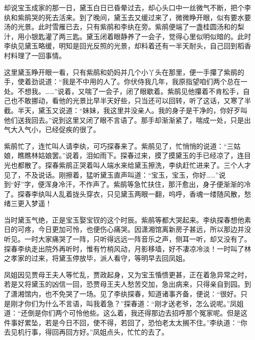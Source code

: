 \begin{parag}
    却说宝玉成家的那一日，黛玉白日已昏晕过去，却心头口中一丝微气不断，把个李纨和紫鹃哭的死去活来。到了晚间，黛玉去又缓过来了，微微睁开眼，似有要水要汤的光景。此时雪雁已去，只有紫鹃和李纨在旁。紫鹃便端了一盏桂圆汤和的梨汁，用小银匙灌了两三匙。黛玉闭着眼静养了一会子，觉得心里似明似暗的。此时李纨见黛玉略缓，明知是回光反照的光景，却料着还有一半天耐头，自己回到稻香村料理了一回事情。
\end{parag}


\begin{parag}
    这里黛玉睁开眼一看，只有紫鹃和奶妈并几个小丫头在那里，便一手攥了紫鹃的手，使着劲说道：“我是不中用的人了。你伏侍我几年，我原指望咱们两个总在一处。不想我。……”说着，又喘了一会子，闭了眼歇着。紫鹃见他攥着不肯松手，自己也不敢挪动，看他的光景比早半天好些，只当还可以回转，听了这话，又寒了半截。半天，黛玉又说道：“妹妹，我这里并没亲人。我的身子是干净的，你好歹叫他们送我回去。”说到这里又闭了眼不言语了。那手却渐渐紧了，喘成一处，只是出气大入气小，已经促疾的很了。
\end{parag}


\begin{parag}
    紫鹃忙了，连忙叫人请李纨，可巧探春来了。紫鹃见了，忙悄悄的说道：“三姑娘，瞧瞧林姑娘罢。”说着，泪如雨下。探春过来，摸了摸黛玉的手已经凉了，连目光也都散了。探春紫鹃正哭着叫人端水来给黛玉擦洗，李纨赶忙进来了。三个人才见了，不及说话。刚擦着，猛听黛玉直声叫道：“宝玉，宝玉，你好……”说到“好”字，便浑身冷汗，不作声了。紫鹃等急忙扶住，那汗愈出，身子便渐渐的冷了。探春李纨叫人乱着拢头穿衣，只见黛玉两眼一翻，呜呼，香魂一缕随风散，愁绪三更入梦遥！
\end{parag}


\begin{parag}
    当时黛玉气绝，正是宝玉娶宝钗的这个时辰。紫鹃等都大哭起来。李纨探春想他素日的可疼，今日更加可怜，也便伤心痛哭。因潇湘馆离新房子甚远，所以那边并没听见。一时大家痛哭了一阵，只听得远远一阵音乐之声，侧耳一听，却又没有了。探春李纨走出院外再听时，惟有竹梢风动，月影移墙，好不凄凉冷淡！一时叫了林之孝家的过来，将黛玉停放毕，派人看守，等明早去回凤姐。
\end{parag}


\begin{parag}
    凤姐因见贾母王夫人等忙乱，贾政起身，又为宝玉惛愦更甚，正在着急异常之时，若是又将黛玉的凶信一回，恐贾母王夫人愁苦交加，急出病来，只得亲自到园。到了潇湘馆内，也不免哭了一场。见了李纨探春，知道诸事齐备，便说：“很好。只是刚才你们为什么不言语，叫我着急？”探春道：“刚才送老爷，怎么说呢。”凤姐道：“还倒是你们两个可怜他些。这么着，我还得那边去招呼那个冤家呢。但是这件事好累坠，若是今日不回，使不得，若回了，恐怕老太太搁不住。”李纨道：“你去见机行事，得回再回方好。”凤姐点头，忙忙的去了。
\end{parag}


